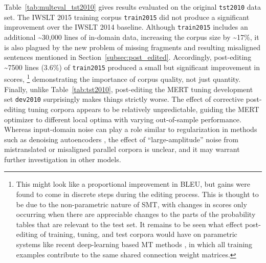 {Table~\ref{tab:multeval_tst2010} gives results evaluated on the original {\small \tt tst2010} data set.
The IWSLT 2015 training corpus {\small \tt train2015} did not produce a significant improvement over the IWSLT 2014 baseline.
Although {\small \tt train2015} includes an additional \textasciitilde 30,000 lines of in-domain data, increasing the corpus size by \textasciitilde 17\%, it is also plagued by the new problem of missing fragments and resulting misaligned sentences mentioned in Section~\ref{subsec:post_edited}.
Accordingly, post-editing \textasciitilde 7500 lines (3.6\%) of {\small \tt train2015} produced a small but significant improvement in scores, \footnote{
This might look like a proportional improvement in BLEU, but gains were found to come in discrete steps during the editing process. 
This is thought to be due to the non-parametric nature of SMT, with changes in scores only occurring when there are appreciable changes to the parts of the probability tables that are relevant to the test set.
It remains to be seen what effect post-editing of training, tuning, and test corpora would have on parametric systems like recent deep-learning based MT methods , in which all training examples contribute to the same shared connection weight matrices.
} demonstrating the importance of corpus quality, not just quantity.
Finally, unlike Table~\ref{tab:tst2010}, post-editing the MERT tuning development set {\small \tt dev2010} surprisingly makes things strictly worse.
The effect of corrective post-editing tuning corpora appears to be relatively unpredictable, guiding the MERT optimizer to different local optima with varying out-of-sample performance.
Whereas input-domain noise can play a role similar to regularization in methods such as denoising autoencoders , the effect of ``large-amplitude'' noise from mistranslated or misaligned parallel corpora is unclear, and it may warrant further investigation in other models.





}
